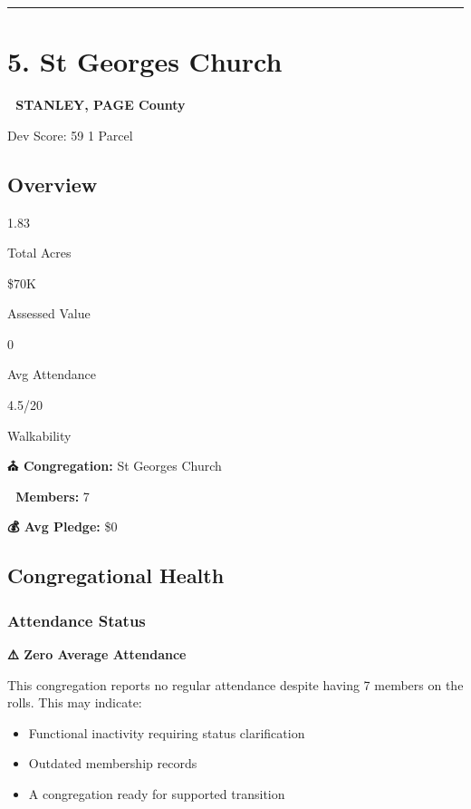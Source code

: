 \documentclass[
  letterpaper,
  DIV=11,
  numbers=noendperiod,
  oneside]{scrreprt}
\providecommand{\tightlist}{%
  \setlength{\itemsep}{0pt}\setlength{\parskip}{0pt}}
\begin{document}
\begin{center}\rule{0.5\linewidth}{0.5pt}\end{center}

\section*{5. St Georges Church}\label{st-georges-church}


\textbf{📍 STANLEY, PAGE County}

{Dev Score: 59} {1 Parcel}

\subsection{Overview}

{1.83}

{Total Acres}

{\$70K}

{Assessed Value}

{0}

{Avg Attendance}

{4.5/20}

{Walkability}

\textbf{⛪ Congregation:} St Georges Church

\textbf{👥 Members:} 7

\textbf{💰 Avg Pledge:} \$0

\subsection{Congregational Health}

\subsubsection{Attendance Status}\label{attendance-status-4}

\textbf{⚠️ Zero Average Attendance}

This congregation reports no regular attendance despite having 7 members
on the rolls. This may indicate:

\begin{itemize}
\tightlist
\item
  Functional inactivity requiring status clarification
\item
  Outdated membership records
\item
  A congregation ready for supported transition
\end{itemize}
\end{document}
